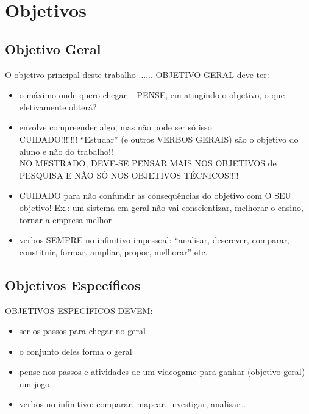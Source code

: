 

\section{Objetivos}
\label{sec:objetivos}
\subsection{Objetivo Geral}
\label{subsec:objGeral}

O objetivo principal deste trabalho ......
OBJETIVO GERAL deve ter:
\begin{itemize}
    \item o máximo onde quero chegar – PENSE, em atingindo o objetivo, o que efetivamente obterá?
    \item envolve compreender algo, mas não pode ser só isso\\
          CUIDADO!!!!!!! “Estudar” (e outros VERBOS GERAIS) são o objetivo do aluno e não do trabalho!!\\
          NO MESTRADO, DEVE-SE PENSAR MAIS NOS OBJETIVOS de PESQUISA E NÃO SÓ NOS OBJETIVOS TÉCNICOS!!!!
    \item CUIDADO para não confundir as consequências do objetivo com O SEU objetivo!
          Ex.: um sistema em geral não vai conscientizar, melhorar o ensino, tornar a empresa melhor
    \item verbos SEMPRE no infinitivo impessoal:
          “analisar, descrever, comparar, constituir, formar, ampliar, propor, melhorar” etc.
\end{itemize}


\subsection{Objetivos Específicos}
\label{subsec:objespecificos}

OBJETIVOS ESPECÍFICOS DEVEM:
\begin{itemize}
    \item ser os passos para chegar no geral
    \item o conjunto deles forma o geral
    \item pense nos passos e atividades de um videogame para ganhar (objetivo geral) um jogo
    \item verbos no infinitivo: comparar, mapear, investigar, analisar…
\end{itemize}



